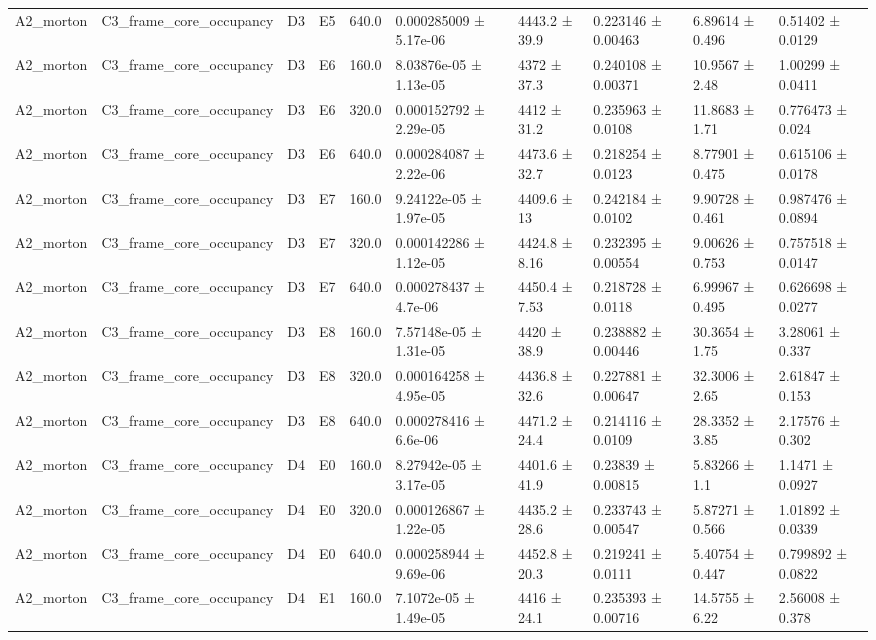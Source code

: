 \begin{table}
\begin{tabular}{llllllllll}
A2\_morton & C3\_frame\_core\_occupancy & D3 & E5 & 640.0 & 0.000285009 ± 5.17e-06 & 4443.2 ± 39.9 & 0.223146 ± 0.00463 & 6.89614 ± 0.496 & 0.51402 ± 0.0129 \\
A2\_morton & C3\_frame\_core\_occupancy & D3 & E6 & 160.0 & 8.03876e-05 ± 1.13e-05 & 4372 ± 37.3 & 0.240108 ± 0.00371 & 10.9567 ± 2.48 & 1.00299 ± 0.0411 \\
A2\_morton & C3\_frame\_core\_occupancy & D3 & E6 & 320.0 & 0.000152792 ± 2.29e-05 & 4412 ± 31.2 & 0.235963 ± 0.0108 & 11.8683 ± 1.71 & 0.776473 ± 0.024 \\
A2\_morton & C3\_frame\_core\_occupancy & D3 & E6 & 640.0 & 0.000284087 ± 2.22e-06 & 4473.6 ± 32.7 & 0.218254 ± 0.0123 & 8.77901 ± 0.475 & 0.615106 ± 0.0178 \\
A2\_morton & C3\_frame\_core\_occupancy & D3 & E7 & 160.0 & 9.24122e-05 ± 1.97e-05 & 4409.6 ± 13 & 0.242184 ± 0.0102 & 9.90728 ± 0.461 & 0.987476 ± 0.0894 \\
A2\_morton & C3\_frame\_core\_occupancy & D3 & E7 & 320.0 & 0.000142286 ± 1.12e-05 & 4424.8 ± 8.16 & 0.232395 ± 0.00554 & 9.00626 ± 0.753 & 0.757518 ± 0.0147 \\
A2\_morton & C3\_frame\_core\_occupancy & D3 & E7 & 640.0 & 0.000278437 ± 4.7e-06 & 4450.4 ± 7.53 & 0.218728 ± 0.0118 & 6.99967 ± 0.495 & 0.626698 ± 0.0277 \\
A2\_morton & C3\_frame\_core\_occupancy & D3 & E8 & 160.0 & 7.57148e-05 ± 1.31e-05 & 4420 ± 38.9 & 0.238882 ± 0.00446 & 30.3654 ± 1.75 & 3.28061 ± 0.337 \\
A2\_morton & C3\_frame\_core\_occupancy & D3 & E8 & 320.0 & 0.000164258 ± 4.95e-05 & 4436.8 ± 32.6 & 0.227881 ± 0.00647 & 32.3006 ± 2.65 & 2.61847 ± 0.153 \\
A2\_morton & C3\_frame\_core\_occupancy & D3 & E8 & 640.0 & 0.000278416 ± 6.6e-06 & 4471.2 ± 24.4 & 0.214116 ± 0.0109 & 28.3352 ± 3.85 & 2.17576 ± 0.302 \\
A2\_morton & C3\_frame\_core\_occupancy & D4 & E0 & 160.0 & 8.27942e-05 ± 3.17e-05 & 4401.6 ± 41.9 & 0.23839 ± 0.00815 & 5.83266 ± 1.1 & 1.1471 ± 0.0927 \\
A2\_morton & C3\_frame\_core\_occupancy & D4 & E0 & 320.0 & 0.000126867 ± 1.22e-05 & 4435.2 ± 28.6 & 0.233743 ± 0.00547 & 5.87271 ± 0.566 & 1.01892 ± 0.0339 \\
A2\_morton & C3\_frame\_core\_occupancy & D4 & E0 & 640.0 & 0.000258944 ± 9.69e-06 & 4452.8 ± 20.3 & 0.219241 ± 0.0111 & 5.40754 ± 0.447 & 0.799892 ± 0.0822 \\
A2\_morton & C3\_frame\_core\_occupancy & D4 & E1 & 160.0 & 7.1072e-05 ± 1.49e-05 & 4416 ± 24.1 & 0.235393 ± 0.00716 & 14.5755 ± 6.22 & 2.56008 ± 0.378 \\

\end{tabular}
\end{table}
